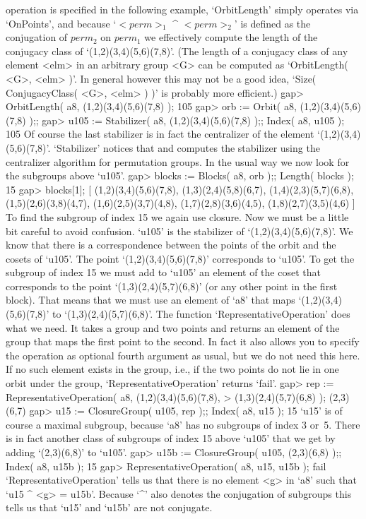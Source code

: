 operation is specified  in the  following example, `OrbitLength'   simply
operates via `OnPoints', and because `$<perm>_1$ ^ $<perm>_2$' is defined
as the conjugation  of  $perm_2$ on $perm_1$  we  effectively compute the
length of the conjugacy class of `(1,2)(3,4)(5,6)(7,8)'. (The length of a
conjugacy class of any  element <elm> in an  arbitrary  group <G>  can be
computed as `OrbitLength( <G>, <elm> )'. In general  however this may not
be a good idea, `Size(  ConjugacyClass( <G>, <elm> )  )' is probably more
efficient.)
\beginexample
    gap> OrbitLength( a8, (1,2)(3,4)(5,6)(7,8) );
    105
    gap> orb := Orbit( a8, (1,2)(3,4)(5,6)(7,8) );;
    gap> u105 := Stabilizer( a8, (1,2)(3,4)(5,6)(7,8) );; Index( a8, u105 );
    105 
\endexample
Of course the  last stabilizer is in  fact the centralizer of the element
`(1,2)(3,4)(5,6)(7,8)'.  `Stabilizer' notices    that and computes    the
stabilizer using the centralizer algorithm for permutation groups. In the
usual way we now look for the subgroups above `u105'.
\beginexample
    gap> blocks := Blocks( a8, orb );; Length( blocks );
    15
    gap> blocks[1];
    [ (1,2)(3,4)(5,6)(7,8), (1,3)(2,4)(5,8)(6,7), (1,4)(2,3)(5,7)(6,8),
      (1,5)(2,6)(3,8)(4,7), (1,6)(2,5)(3,7)(4,8), (1,7)(2,8)(3,6)(4,5),
      (1,8)(2,7)(3,5)(4,6) ]
\endexample
To find the subgroup of index 15 we  again use closure. Now  we must be a
little bit  careful to avoid    confusion. `u105' is the  stabilizer   of
`(1,2)(3,4)(5,6)(7,8)'. We  know  that there is  a correspondence between
the  points  of  the   orbit and  the   cosets  of  `u105'.   The   point
`(1,2)(3,4)(5,6)(7,8)' corresponds   to `u105'.  To get  the  subgroup of
index 15 we  must add to `u105' an  element of the coset that corresponds
to the   point `(1,3)(2,4)(5,7)(6,8)' (or any other   point  in the first
block).  That means   that  we must  use  an  element of `a8'  that  maps
`(1,2)(3,4)(5,6)(7,8)' to  `(1,3)(2,4)(5,7)(6,8)'.        The    function
`RepresentativeOperation'   does what we need. It   takes a group and two
points and returns an  element of the group that  maps the first point to
the   second. In fact it   also allows you  to   specify the operation as
optional fourth argument as usual,  but we do  not need this here. If  no
such element exists in the  group, i.e., if the  two points do not lie in
one orbit under the group, `RepresentativeOperation' returns `fail'.
\beginexample
    gap> rep := RepresentativeOperation( a8, (1,2)(3,4)(5,6)(7,8),
    >                                        (1,3)(2,4)(5,7)(6,8) );
    (2,3)(6,7)
    gap> u15 := ClosureGroup( u105, rep );; Index( a8, u15 );
    15 
\endexample
`u15' is of course a maximal  subgroup, because `a8'  has no subgroups of
index 3 or~5.  There is in fact  another  class of subgroups  of index 15
above `u105' that we get by adding `(2,3)(6,8)' to `u105'.
\beginexample
    gap> u15b := ClosureGroup( u105, (2,3)(6,8) );; Index( a8, u15b );
    15 
    gap> RepresentativeOperation( a8, u15, u15b );
    fail
\endexample
`RepresentativeOperation' tells us that  there is no  element <g> in `a8'
such that `u15 ^ <g> = u15b'. Because `^' also denotes the conjugation of
subgroups this tells us  that  `u15' and  `u15b' are not  conjugate.

